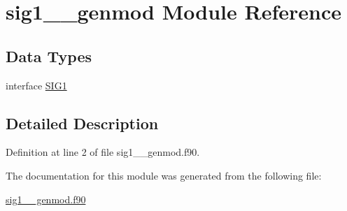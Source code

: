 \hypertarget{classsig1____genmod}{\section{sig1\+\_\+\+\_\+genmod Module Reference}
\label{classsig1____genmod}
}
\subsection*{Data Types}
\begin{DoxyCompactItemize}
\item 
interface \hyperlink{interfacesig1____genmod_1_1SIG1}{S\+I\+G1}
\end{DoxyCompactItemize}


\subsection{Detailed Description}


Definition at line 2 of file sig1\+\_\+\+\_\+genmod.\+f90.



The documentation for this module was generated from the following file\+:\begin{DoxyCompactItemize}
\item 
\hyperlink{sig1____genmod_8f90}{sig1\+\_\+\+\_\+genmod.\+f90}\end{DoxyCompactItemize}
